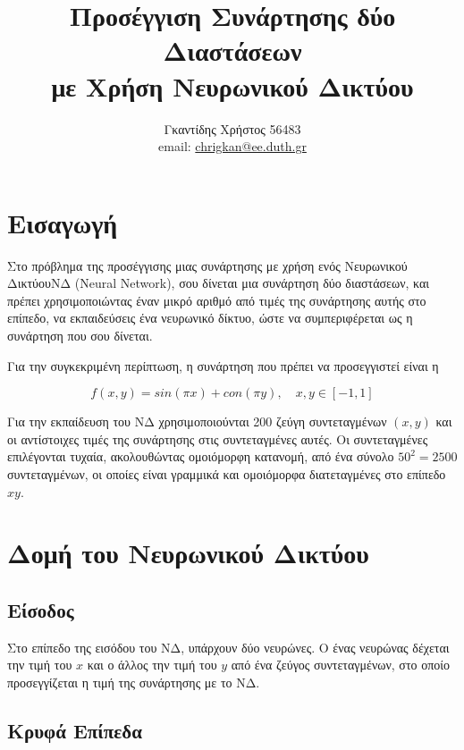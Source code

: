 \documentclass[11pt]{article}
\title{Προσέγγιση Συνάρτησης δύο Διαστάσεων\\με Χρήση Νευρωνικού Δικτύου}
\date{\DTMtoday}
\author{Γκαντίδης Χρήστος 56483 \\ email: \href{mailto:chrigkan@ee.duth.gr}{chrigkan@ee.duth.gr}}
\begin{document}
\maketitle
\newpage

\tableofcontents
\newpage


\section{Εισαγωγή}

Στο πρόβλημα της προσέγγισης μιας συνάρτησης με χρήση ενός Νευρωνικού Δικτύου\textendash ΝΔ (Neural Network), σου δίνεται μια συνάρτηση δύο διαστάσεων, και πρέπει χρησιμοποιώντας έναν μικρό αριθμό από τιμές της συνάρτησης αυτής στο επίπεδο, να εκπαιδεύσεις ένα νευρωνικό δίκτυο, ώστε να συμπεριφέρεται ως η συνάρτηση που σου δίνεται.

Για την συγκεκριμένη περίπτωση, η συνάρτηση που πρέπει να προσεγγιστεί είναι η

\begin{equation*}
	f(x, y)=sin(\pi x) + con(\pi y),\quad x, y \in [-1, 1]
\end{equation*}

Για την εκπαίδευση του ΝΔ χρησιμοποιούνται 200 ζεύγη συντεταγμένων $(x, y)$ και οι αντίστοιχες τιμές της συνάρτησης στις συντεταγμένες αυτές. Οι συντεταγμένες επιλέγονται τυχαία, ακολουθώντας ομοιόμορφη κατανομή, από ένα σύνολο $50^2=2500$ συντεταγμένων, οι οποίες είναι γραμμικά και ομοιόμορφα διατεταγμένες στο επίπεδο $xy$.

\section{Δομή του Νευρωνικού Δικτύου}

\subsection{Είσοδος}

Στο επίπεδο της εισόδου του ΝΔ, υπάρχουν δύο νευρώνες. Ο ένας νευρώνας δέχεται την τιμή του $x$ και ο άλλος την τιμή του $y$ από ένα ζεύγος συντεταγμένων, στο οποίο προσεγγίζεται η τιμή της συνάρτησης με το ΝΔ.

\subsection{Κρυφά Επίπεδα}
\end{document}

